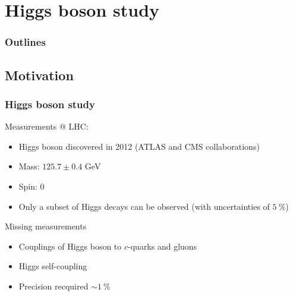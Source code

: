 \documentclass{beamer}
\begin{document}
\section{Higgs boson study}
  \begin{frame}
    \frametitle{Outlines}
    \begin{minipage}{\textwidth}
      \tableofcontents[currentsection,hideothersubsections, 
      sectionstyle=show/shaded,]
    \end{minipage}
  \end{frame}

  \subsection{Motivation}

    \begin{frame}
      \frametitle{Higgs boson study}


      
      \begin{block}{Measurements @ LHC:}
        \begin{itemize}
          \item Higgs boson discovered in 2012 (ATLAS and CMS collaborations)
          \item Mass: $125.7 \pm 0.4$ GeV
          \item Spin: 0
          \item Only a subset of Higgs decays can be observed (with uncertainties of $5~\%$)
        \end{itemize}
      \end{block}

      \begin{alertblock}{Missing measurements}
        \begin{itemize}
          \item Couplings of Higgs boson to $c$-quarks and gluons
          \item Higgs self-coupling
          \item Precision recquired $\sim 1~\%$
        \end{itemize}
      \end{alertblock}
    \end{frame}
\end{document}
